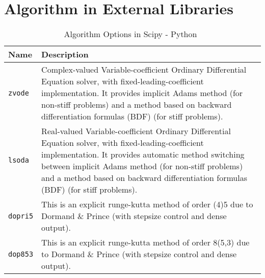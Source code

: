 	
	

\pagebreak

\section{Algorithm in External Libraries}
\label{alg_externallib}

\begin{table}[ht]
\begin{tabular}{ p{} p{} }
	\textbf{Name} & \textbf{Description} \\
	\toprule
	\verb|zvode| & Complex-valued Variable-coefficient Ordinary Differential Equation solver, with fixed-leading-coefficient implementation. It provides implicit Adams method (for non-stiff problems) and a method based on backward differentiation formulas (BDF) (for stiff problems).\\ \hline
	\verb|lsoda| & Real-valued Variable-coefficient Ordinary Differential Equation solver, with fixed-leading-coefficient implementation. It provides automatic method switching between implicit Adams method (for non-stiff problems) and a method based on backward differentiation formulas (BDF) (for stiff problems).\\ \hline
	\verb|dopri5| & This is an explicit runge-kutta method of order (4)5 due to Dormand \& Prince (with stepsize control and dense output).\\ \hline
	\verb|dop853| & This is an explicit runge-kutta method of order 8(5,3) due to Dormand \& Prince (with stepsize control and dense output).\\
	\bottomrule	
\end{tabular}	
\caption{Algorithm Options in Scipy - Python~\citep{scipyfun}}	
\label{tab_algscipy}
\end{table}

